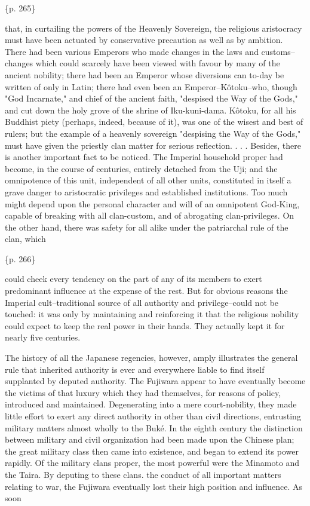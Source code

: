 \{p. 265\}

that, in curtailing the powers of the Heavenly Sovereign, the religious aristocracy must have been actuated by conservative precaution as well as by ambition. There had been various Emperors who made changes in the laws and customs--changes which could scarcely have been viewed with favour by many of the ancient nobility; there had been an Emperor whose diversions can to-day be written of only in Latin; there had even been an Emperor--Kôtoku--who, though "God Incarnate," and chief of the ancient faith, "despised the Way of the Gods," and cut down the holy grove of the shrine of Iku-kuni-dama. Kôtoku, for all his Buddhist piety (perhaps, indeed, because of it), was one of the wisest and best of rulers; but the example of a heavenly sovereign "despising the Way of the Gods," must have given the priestly clan matter for serious reflection. . . . Besides, there is another important fact to be noticed. The Imperial household proper had become, in the course of centuries, entirely detached from the Uji; and the omnipotence of this unit, independent of all other units, constituted in itself a grave danger to aristocratic privileges and established institutions. Too much might depend upon the personal character and will of an omnipotent God-King, capable of breaking with all clan-custom, and of abrogating clan-privileges. On the other hand, there was safety for all alike under the patriarchal rule of the clan, which

\{p. 266\}

could cheek every tendency on the part of any of its members to exert predominant influence at the expense of the rest. But for obvious reasons the Imperial cult--traditional source of all authority and privilege--could not be touched: it was only by maintaining and reinforcing it that the religious nobility could expect to keep the real power in their hands. They actually kept it for nearly five centuries.



The history of all the Japanese regencies, however, amply illustrates the general rule that inherited authority is ever and everywhere liable to find itself supplanted by deputed authority. The Fujiwara appear to have eventually become the victims of that luxury which they had themselves, for reasons of policy, introduced and maintained. Degenerating into a mere court-nobility, they made little effort to exert any direct authority in other than civil directions, entrusting military matters almost wholly to the Buké. In the eighth century the distinction between military and civil organization had been made upon the Chinese plan; the great military class then came into existence, and began to extend its power rapidly. Of the military clans proper, the most powerful were the Minamoto and the Taira. By deputing to these clans. the conduct of all important matters relating to war, the Fujiwara eventually lost their high position and influence. As soon

